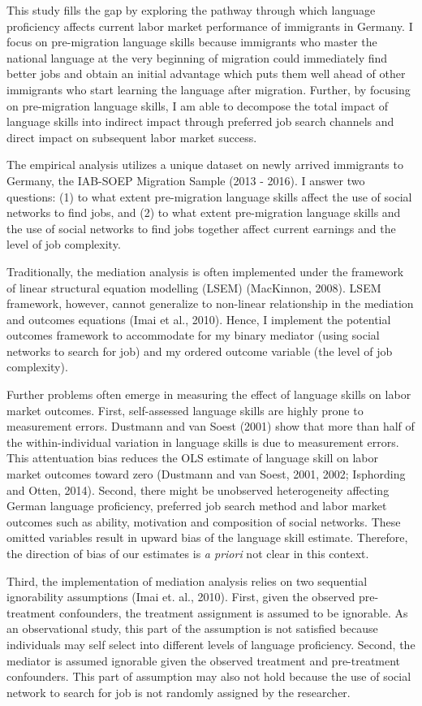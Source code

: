 \documentclass[12pt,a4paper]{article}
\begin{document}
This study fills the gap by exploring the pathway through which language proficiency affects current labor market performance of immigrants in Germany. I focus on pre-migration language skills because immigrants who master the national language at the very beginning of migration could immediately find better jobs and obtain an initial advantage which puts them well ahead of other immigrants who start learning the language after migration. Further, by focusing on pre-migration language skills, I am able to decompose the total impact of language skills into indirect impact through preferred job search channels and direct impact on subsequent labor market success.

The empirical analysis utilizes a unique dataset on newly arrived immigrants to Germany, the IAB-SOEP Migration Sample (2013 - 2016). I answer two questions: (1) to what extent pre-migration language skills affect the use of social networks to find jobs, and (2) to what extent pre-migration language skills and the use of social networks to find jobs together affect current earnings and the level of job complexity.

Traditionally, the mediation analysis is often implemented under the framework of linear structural equation modelling (LSEM) (MacKinnon, 2008). LSEM framework, however, cannot generalize to non-linear relationship in the mediation and outcomes equations (Imai et al., 2010). Hence, I implement the potential outcomes framework to accommodate for my binary mediator (using social networks to search for job) and my ordered outcome variable (the level of job complexity).

Further problems often emerge in measuring the effect of language skills on labor market outcomes. First, self-assessed language skills are highly prone to measurement errors. Dustmann and van Soest (2001) show that more than half of the within-individual variation in language skills is due to measurement errors. This attentuation bias reduces the OLS estimate of language skill on labor market outcomes toward zero (Dustmann and van Soest, 2001, 2002; Isphording and Otten, 2014). Second, there might be unobserved heterogeneity affecting German language proficiency, preferred job search method and labor market outcomes such as ability, motivation and composition of social networks. These omitted variables result in upward bias of the language skill estimate. Therefore, the direction of bias of our estimates is \textit{a priori} not clear in this context.

Third, the implementation of mediation analysis relies on two sequential ignorability assumptions (Imai et. al., 2010). First, given the observed pre-treatment confounders, the treatment assignment is assumed to be ignorable. As an observational study, this part of the assumption is not satisfied because individuals may self select into different levels of language proficiency. Second, the mediator is assumed ignorable given the observed treatment and pre-treatment confounders. This part of assumption may also not hold because the use of social network to search for job is not randomly assigned by the researcher.
\end{document}
